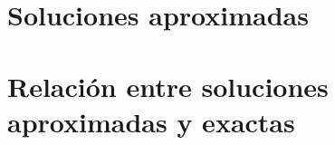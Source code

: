 \newpage
\section{Soluciones aproximadas}

\newpage
\section{Relación entre soluciones aproximadas y exactas}

